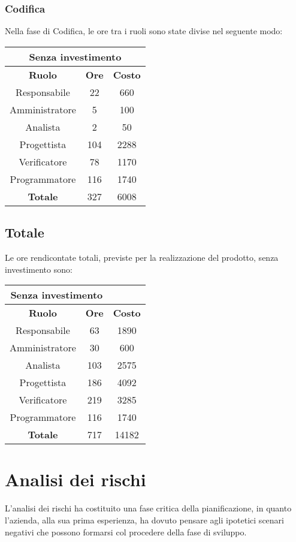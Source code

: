 \documentclass{scalatekids-article}
\begin{document}
\subsubsection{Codifica}
Nella fase di Codifica, le ore tra i ruoli sono state divise nel seguente modo:
\begin{center}
  \normalsize
  \begin{tabular}{| c | c | c |}
    \hline
    \multicolumn{3}{|c|}{\textbf{Senza investimento}}\\
    \hline
    \textbf{Ruolo} & \textbf{Ore} & \textbf{Costo}\\
    \hline
    Responsabile & 22 & 660\\
    Amministratore & 5 & 100\\
    Analista & 2 & 50\\
    Progettista & 104 & 2288\\
    Verificatore & 78 & 1170 \\
    Programmatore & 116 & 1740 \\
    \hline
    \textbf{Totale} & 327 & 6008 \\
    \hline
  \end{tabular}
\end{center}
\subsection{Totale}
Le ore rendicontate totali, previste per la realizzazione del prodotto, senza
investimento sono:
\begin{center}
  \normalsize
  \begin{tabular}{| c | c | c |}
    \hline
    \multicolumn{2}{|c|}{\textbf{Senza investimento}}\\
    \hline
    \textbf{Ruolo} & \textbf{Ore} & \textbf{Costo}\\
    \hline
    Responsabile & 63 & 1890\\
    Amministratore & 30 & 600\\
    Analista & 103 & 2575\\
    Progettista & 186 & 4092\\
    Verificatore & 219 & 3285\\
    Programmatore & 116 & 1740 \\
    \hline
    \textbf{Totale} & 717 & 14182 \\
    \hline
  \end{tabular}
\end{center}
\section{Analisi dei rischi}
L'analisi dei rischi ha costituito una fase critica della pianificazione, in
quanto l'azienda, alla sua prima esperienza, ha dovuto pensare agli ipotetici
scenari negativi che possono formarsi col procedere della fase di sviluppo.
\end{document}

